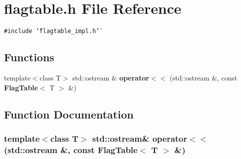 \section{flagtable.h File Reference}
\label{flagtable_8h}
{\tt \#include \char`\"{}flagtable\_\-impl.h\char`\"{}}\par
\subsection*{Functions}
\begin{CompactItemize}
\item 
template$<$class T$>$ std::ostream \& {\bf operator$<$$<$} (std::ostream \&, const {\bf Flag\-Table}$<$ T $>$ \&)
\end{CompactItemize}


\subsection{Function Documentation}
\subsubsection{\setlength{\rightskip}{0pt plus 5cm}template$<$class T$>$ std::ostream\& operator$<$$<$ (std::ostream \&, const {\bf Flag\-Table}$<$ T $>$ \&)}\label{flagtable_8h_a0}


